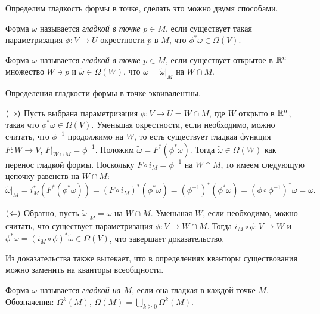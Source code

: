 Определим гладкость формы в точке, сделать это можно двумя способами. 

\begin{definition}
	Форма $\omega$ называется \textit{гладкой в точке} $p \in M$, если существует такая параметризация $\phi : V \to U$ окрестности $p$ в $M$, что $\phi^* \omega \in \Omega(V)$.
\end{definition}

\begin{definition}
	Форма $\omega$ называется \textit{гладкой в точке} $p \in M$, если существует открытое в $\mathbb{R}^n$ множество $W \ni p$ и $\widetilde{\omega} \in \Omega(W)$, что $\omega = \widetilde{\omega}|_M$ на $W \cap M$.
\end{definition}

\begin{lemma}
	Определения гладкости формы в точке эквивалентны.
\end{lemma}

\begin{myproof}
	$(\Rightarrow)$ Пусть выбрана параметризация $\phi : V \to U = W \cap M$, где $W$ открыто в $\mathbb{R}^n$, такая что $\phi^* \omega \in \Omega(V)$. 
	Уменьшая окрестности, если необходимо, можно считать, что $\phi^{-1}$ продолжимо на $W$, то есть существует гладкая функция $F : W \to V$, $F|_{W \cap M} = \phi^{-1}$. 
	Положим $\widetilde{\omega} = F^*(\phi^* \omega)$. 
	Тогда $\widetilde{\omega} \in \Omega(W)$ как перенос гладкой формы. 
	Поскольку $F \circ i_M = \phi^{-1}$ на $W \cap M$, то имеем следующую цепочку равенств на $W \cap M$:
	\[ \widetilde{\omega}|_M = i_M^* (F^* (\phi^* \omega)) = (F \circ i_M)^* (\phi^* \omega) = (\phi^{-1})^* (\phi^* \omega) = (\phi \circ \phi^{-1})^* \omega = \omega. \]

	\vspace{5pt}
	$(\Leftarrow)$ Обратно, пусть $\widetilde{\omega}|_M = \omega$ на $W \cap M$. Уменьшая $W$, если необходимо, можно считать, что существует параметризация $\phi : V \to W \cap M$. 
	Тогда $i_M \circ \phi : V \to W$ и $\phi^* \omega = (i_M \circ \phi)^* \widetilde{\omega} \in \Omega(V)$, что завершает доказательство.
\end{myproof}

\begin{note}
	Из доказательства также вытекает, что в определениях кванторы существования можно заменить на кванторы всеобщности. 
\end{note}

\begin{definition}
	Форма $\omega$ называется \textit{гладкой на $M$}, если она гладкая в каждой точке $M$.
	Обозначения: $\Omega^k(M)$, $\Omega(M) = \bigcup_{k \geq 0} \Omega^k(M)$. 
\end{definition}


